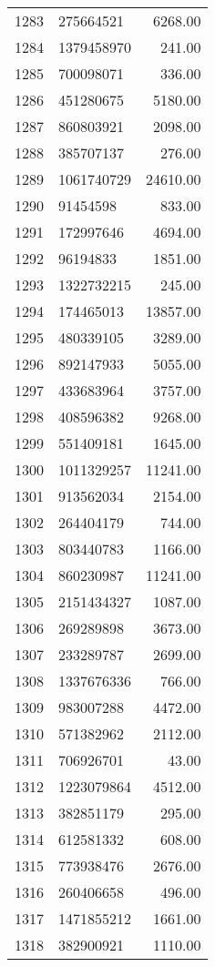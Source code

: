\begin{table}[ht]
\begin{tabular}{rlr}
  1283 & 275664521 & 6268.00 \\ 
  1284 & 1379458970 & 241.00 \\ 
  1285 & 700098071 & 336.00 \\ 
  1286 & 451280675 & 5180.00 \\ 
  1287 & 860803921 & 2098.00 \\ 
  1288 & 385707137 & 276.00 \\ 
  1289 & 1061740729 & 24610.00 \\ 
  1290 & 91454598 & 833.00 \\ 
  1291 & 172997646 & 4694.00 \\ 
  1292 & 96194833 & 1851.00 \\ 
  1293 & 1322732215 & 245.00 \\ 
  1294 & 174465013 & 13857.00 \\ 
  1295 & 480339105 & 3289.00 \\ 
  1296 & 892147933 & 5055.00 \\ 
  1297 & 433683964 & 3757.00 \\ 
  1298 & 408596382 & 9268.00 \\ 
  1299 & 551409181 & 1645.00 \\ 
  1300 & 1011329257 & 11241.00 \\ 
  1301 & 913562034 & 2154.00 \\ 
  1302 & 264404179 & 744.00 \\ 
  1303 & 803440783 & 1166.00 \\ 
  1304 & 860230987 & 11241.00 \\ 
  1305 & 2151434327 & 1087.00 \\ 
  1306 & 269289898 & 3673.00 \\ 
  1307 & 233289787 & 2699.00 \\ 
  1308 & 1337676336 & 766.00 \\ 
  1309 & 983007288 & 4472.00 \\ 
  1310 & 571382962 & 2112.00 \\ 
  1311 & 706926701 & 43.00 \\ 
  1312 & 1223079864 & 4512.00 \\ 
  1313 & 382851179 & 295.00 \\ 
  1314 & 612581332 & 608.00 \\ 
  1315 & 773938476 & 2676.00 \\ 
  1316 & 260406658 & 496.00 \\ 
  1317 & 1471855212 & 1661.00 \\ 
  1318 & 382900921 & 1110.00 \\ 

\end{tabular}
\end{table}
